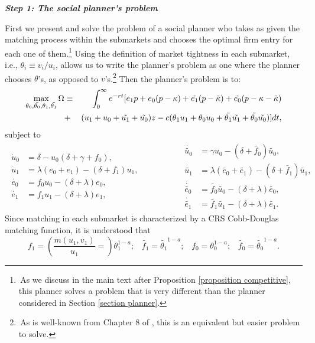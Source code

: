 \documentclass[12pt]{article} %
\theoremstyle{definition}
\begin{document}
\begin{appendix}
\medskip 

\noindent \textit{\textbf{Step 1: The social planner's problem}} 

\medskip 


\noindent First we present and solve the problem of a social planner who takes as given the matching process within the submarkets and chooses the optimal firm entry for each one of them.\footnote{\,As we discuss in the main text after Proposition \ref{proposition competitive}, this planner solves a problem that is very different than the planner considered in Section \ref{section planner}.} Using the definition of market tightness in each submarket, i.e., $\theta_i\equiv {v_i}/{u_i}$, allows us to write the planner's problem as one where the planner chooses $\theta$'s, as opposed to $v$'s.\footnote{\,As is well-known from Chapter 8 of \cite{pissarides2000equilibrium}, this is an equivalent but easier problem to solve.} Then the  planner's problem is to: 
\begin{eqnarray*}
\max_{\theta_0,\tilde{\theta_0},\theta_1,\tilde{\theta_1}} \Omega &\equiv&\int_0^{\infty} e^{-rt}[ e_1 p + e_0 (p-\kappa) + \tilde{e_1}(p-\tilde{\kappa}) 
+ \tilde{e_0}(p-\kappa-\tilde{\kappa}) \nonumber \\
&+& (u_1+u_0+\tilde{u_1}+\tilde{u_0})z-c(\theta_1 u_1+\theta_0 u_0+\tilde{\theta_1}\tilde{u_1}+\tilde{\theta_0}\tilde{u_0})]dt,  
\vspace{-3mm}
\end{eqnarray*}
subject to 
\vspace{-2mm}
\begin{eqnarray*} 
\begin{split}
\dot{u}_0 &=\delta -u_0(\delta +\gamma +f_0),\\ 
\dot{u}_1 &= \lambda (e_0+e_1) - (\delta + f_1)u_1,\\
\dot{e_0}&= f_0 u_0 -(\delta+\lambda) e_0, \\
\dot{e_1}&= f_1 u_1 -(\delta+\lambda) e_1, 
\end{split}
\hspace{2cm}
\begin{split}
\dot{\tilde{u_0}} &= \gamma u_0 - (\delta  +\tilde{f_0})\tilde{u_0},\\ 
\dot{\tilde{u_1}} &= \lambda (\tilde{e_0}+\tilde{e_1}) - (\delta + \tilde{f_1})\tilde{u_1},\\   
\dot{\tilde{e_0}} &= \tilde{f_0} \tilde{u_0} -(\delta+\lambda) \tilde{e_0},\\
\dot{\tilde{e_1}} &= \tilde{f_1} \tilde{u_1} -(\delta+\lambda) \tilde{e_1}. 
\end{split}
\end{eqnarray*}Since matching in each submarket is characterized by a CRS Cobb-Douglas matching function, it is understood that 
\begin{equation*}
f_1=\left(\frac{m(u_1,v_1)}{u_1}=\right)\theta_1^{1-a};\,\,\,\,\, \tilde{f_1}=
\tilde{\theta_1}^{1-a}; \,\,\,\,\, f_0=
\theta_0^{1-a};\,\,\,\,\, \tilde{f_0}=
\tilde{\theta_0}^{1-a}.
\end{equation*}


\end{appendix}
\end{document}
